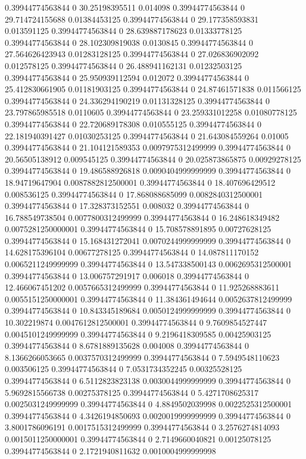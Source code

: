 0.39944774563844 0 30.25198395511 0.014098
0.39944774563844 0 29.714724155688 0.01384453125
0.39944774563844 0 29.177358593831 0.013591125
0.39944774563844 0 28.639887178623 0.01333778125
0.39944774563844 0 28.102309819038 0.0130845
0.39944774563844 0 27.564626423943 0.01283128125
0.39944774563844 0 27.026836902092 0.012578125
0.39944774563844 0 26.488941162131 0.01232503125
0.39944774563844 0 25.950939112594 0.012072
0.39944774563844 0 25.412830661905 0.01181903125
0.39944774563844 0 24.87461571838 0.011566125
0.39944774563844 0 24.336294190219 0.01131328125
0.39944774563844 0 23.797865985518 0.0110605
0.39944774563844 0 23.259331012258 0.01080778125
0.39944774563844 0 22.720689178308 0.010555125
0.39944774563844 0 22.181940391427 0.01030253125
0.39944774563844 0 21.643084559264 0.01005
0.39944774563844 0 21.104121589353 0.0097975312499999
0.39944774563844 0 20.56505138912 0.009545125
0.39944774563844 0 20.025873865875 0.00929278125
0.39944774563844 0 19.486588926818 0.0090404999999999
0.39944774563844 0 18.94719647904 0.0087882812500001
0.39944774563844 0 18.407696429512 0.008536125
0.39944774563844 0 17.868088685099 0.0082840312500001
0.39944774563844 0 17.328373152551 0.008032
0.39944774563844 0 16.788549738504 0.0077800312499999
0.39944774563844 0 16.248618349482 0.0075281250000001
0.39944774563844 0 15.708578891895 0.00727628125
0.39944774563844 0 15.168431272041 0.0070244999999999
0.39944774563844 0 14.628175396104 0.00677278125
0.39944774563844 0 14.087811170152 0.0065211249999999
0.39944774563844 0 13.547338500143 0.0062695312500001
0.39944774563844 0 13.006757291917 0.006018
0.39944774563844 0 12.466067451202 0.0057665312499999
0.39944774563844 0 11.925268883611 0.0055151250000001
0.39944774563844 0 11.384361494644 0.0052637812499999
0.39944774563844 0 10.843345189684 0.0050124999999999
0.39944774563844 0 10.302219874 0.0047612812500001
0.39944774563844 0 9.7609854527447 0.0045101249999999
0.39944774563844 0 9.2196418309585 0.00425903125
0.39944774563844 0 8.6781889135628 0.004008
0.39944774563844 0 8.1366266053665 0.0037570312499999
0.39944774563844 0 7.5949548110623 0.003506125
0.39944774563844 0 7.0531734352245 0.00325528125
0.39944774563844 0 6.5112823823138 0.0030044999999999
0.39944774563844 0 5.9692815566738 0.00275378125
0.39944774563844 0 5.4271708625317 0.0025031249999999
0.39944774563844 0 4.8849502039998 0.0022525312500001
0.39944774563844 0 4.3426194850693 0.0020019999999999
0.39944774563844 0 3.8001786096191 0.0017515312499999
0.39944774563844 0 3.2576274814093 0.0015011250000001
0.39944774563844 0 2.7149660040821 0.00125078125
0.39944774563844 0 2.1721940811632 0.0010004999999998
